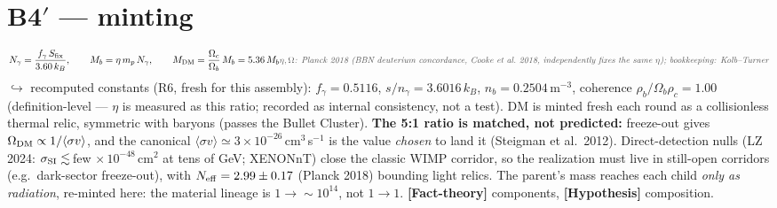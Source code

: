 \documentclass[11pt]{article}
\newcommand{\factth}{\textcolor{green!40!black}{\textbf{[Fact-theory]}}}
\newcommand{\hyp}{\textcolor{orange!80!black}{\textbf{[Hypothesis]}}}
\newcommand{\own}[1]{\hfill{\small\textcolor{gray!70!black}{\textit{#1}}}}
\begin{document}
\section{B4$'$ --- minting}
\begin{equation}
N_\gamma=\frac{f_\gamma\,S_{\rm fix}}{3.60\,k_B},\qquad
M_b=\eta\,m_p\,N_\gamma,\qquad
M_{\rm DM}=\frac{\Omega_c}{\Omega_b}\,M_b=5.36\,M_b
\own{$\eta,\Omega$: Planck 2018 (BBN deuterium concordance, Cooke et al.\ 2018, independently fixes the same $\eta$); bookkeeping: Kolb--Turner}
\label{eq:b4mint}
\end{equation}
$\hookrightarrow$ recomputed constants (R6, fresh for this assembly): $f_\gamma=0.5116$, $s/n_\gamma=3.6016\,k_B$, $n_b=0.2504$\,m$^{-3}$, coherence $\rho_b/\Omega_b\rho_c=1.00$ (definition-level --- $\eta$ is measured as this ratio; recorded as internal consistency, not a test). DM is minted fresh each round as a collisionless thermal relic, symmetric with baryons (passes the Bullet Cluster). \textbf{The 5:1 ratio is matched, not predicted:} freeze-out gives $\Omega_{\rm DM}\propto1/\langle\sigma v\rangle$, and the canonical $\langle\sigma v\rangle\simeq3\times10^{-26}$\,cm$^3$\,s$^{-1}$ is the value \emph{chosen} to land it (Steigman et al.\ 2012). Direct-detection nulls (LZ 2024: $\sigma_{\rm SI}\lesssim\,$few$\,\times10^{-48}$\,cm$^2$ at tens of GeV; XENONnT) close the classic WIMP corridor, so the realization must live in still-open corridors (e.g.\ dark-sector freeze-out), with $N_{\rm eff}=2.99\pm0.17$ (Planck 2018) bounding light relics. The parent's mass reaches each child \emph{only as radiation}, re-minted here: the material lineage is $1\to\sim\!10^{14}$, not $1\to1$. \factth{} components, \hyp{} composition.

\end{document}
